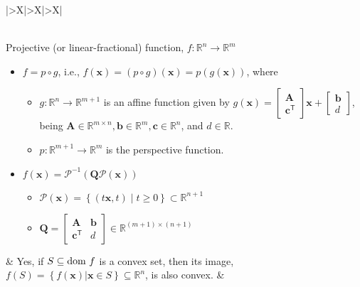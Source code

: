 \documentclass{article}
\begin{document}
\begin{table}[ht!]
\begin{tabularx}{\textwidth}{|>{\setlength\hsize{1\hsize}\setlength\linewidth{\hsize}}X|>{\setlength\hsize{.9\hsize}\setlength\linewidth{\hsize}}X|>{\setlength\hsize{1.1\hsize}\setlength\linewidth{\hsize}}X|}
\begin{itemize}[leftmargin=*]
        \end{itemize} \\
        \hline
        Projective (or linear-fractional) function, \(f: \mathbb{R}^{n} \rightarrow \mathbb{R}^{m}\)
        \begin{itemize}[leftmargin=*]
            \item \(f = p \circ g\), i.e., \(f(\mathbf{x}) = (p\circ g)(\mathbf{x}) = p(g(\mathbf{x}))\), where
                \begin{itemize}[label={$\triangleright$}]
                    \item \(g: \mathbb{R}^{n} \rightarrow \mathbb{R}^{m+1}\) is an affine function given by \(g(\mathbf{x}) = \begin{bmatrix}
                        \mathbf{A}\\
                        \mathbf{c}^\mathsf{T}
                    \end{bmatrix} \mathbf{x} + \begin{bmatrix}
                        \mathbf{b} \\
                        d
                    \end{bmatrix}\), being \(\mathbf{A}\in \mathbb{R}^{m \times n}, \mathbf{b} \in \mathbb{R}^{m}, \mathbf{c} \in \mathbb{R}^{n}\), and \(d \in \mathbb{R}\).
                    \item \(p: \mathbb{R}^{m+1} \rightarrow \mathbb{R}^{m}\) is the perspective function.
                \end{itemize}
            \item \(f(\mathbf{x}) = \mathcal{P}^{-1}(\mathbf{Q}\mathcal{P}(\mathbf{x}))\)
                \begin{itemize}[label={$\triangleright$}]
                    \item \(\mathcal{P}(\mathbf{x}) = \left\{ (t\mathbf{x}, t) \mid t \geq 0 \right\} \subset \mathbb{R}^{n+1}\)
                    \item \(\mathbf{Q} = \begin{bmatrix}
                        \mathbf{A} & \mathbf{b} \\
                        \mathbf{c}^\mathsf{T} & d
                    \end{bmatrix} \in \mathbb{R}^{(m+1)\times(n+1)}\)
                \end{itemize}
        \end{itemize} & Yes, if \(S \subseteq \textnormal{dom } f\) is a convex set, then its image, \(f(S) = \left\{ f(\mathbf{x})|\mathbf{x}\in S \right\} \subseteq \mathbb{R}^{n}\), is also convex. & \vspace{-3.5ex} \begin{itemize}[leftmargin=*]

\end{itemize}
\end{tabularx}
\end{table}
\end{document}
